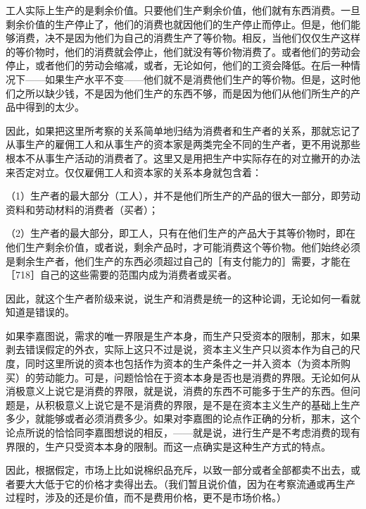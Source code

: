 工人实际上生产的是剩余价值。只要他们生产剩余价值，他们就有东西消费。一旦剩余价值的生产停止了，他们的消费也就因他们的生产停止而停止。但是，他们能够消费，决不是因为他们为自己的消费生产了等价物。相反，当他们仅仅生产这样的等价物时，他们的消费就会停止，他们就没有等价物消费了。或者他们的劳动会停止，或者他们的劳动会缩减，或者，无论如何，他们的工资会降低。在后一种情况下——如果生产水平不变——他们就不是消费他们生产的等价物。但是，这时他们之所以缺少钱，不是因为他们生产的东西不够，而是因为他们从他们所生产的产品中得到的太少。

因此，如果把这里所考察的关系简单地归结为消费者和生产者的关系，那就忘记了从事生产的雇佣工人和从事生产的资本家是两类完全不同的生产者，更不用说那些根本不从事生产活动的消费者了。这里又是用把生产中实际存在的对立撇开的办法来否定对立。仅仅雇佣工人和资本家的关系本身就包含着：

（1）生产者的最大部分（工人），并不是他们所生产的产品的很大一部分，即劳动资料和劳动材料的消费者（买者）；

（2）生产者的最大部分，即工人，只有在他们生产的产品大于其等价物时，即在他们生产剩余价值，或者说，剩余产品时，才可能消费这个等价物。他们始终必须是剩余生产者，他们生产的东西必须超过自己的［有支付能力的］需要，才能在［718］自己的这些需要的范围内成为消费者或买者。

因此，就这个生产者阶级来说，说生产和消费是统一的这种论调，无论如何一看就知道是错误的。

如果李嘉图说，需求的唯一界限是生产本身，而生产只受资本的限制，那末，如果剥去错误假定的外衣，实际上这只不过是说，资本主义生产只以资本作为自己的尺度，同时这里所说的资本也包括作为资本的生产条件之一并入资本（为资本所购买）的劳动能力。可是，问题恰恰在于资本本身是否也是消费的界限。无论如何从消极意义上说它是消费的界限，就是说，消费的东西不可能多于生产的东西。但问题是，从积极意义上说它是不是消费的界限，是不是在资本主义生产的基础上生产多少，就能够或者必须消费多少。如果对李嘉图的论点作正确的分析，那末，这个论点所说的恰恰同李嘉图想说的相反，——就是说，进行生产是不考虑消费的现有界限的，生产只受资本本身的限制。而这一点确实是这种生产方式的特点。

因此，根据假定，市场上比如说棉织品充斥，以致一部分或者全部都卖不出去，或者要大大低于它的价格才卖得出去。（我们暂且说价值，因为在考察流通或再生产过程时，涉及的还是价值，而不是费用价格，更不是市场价格。）

